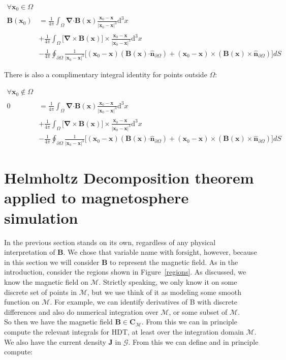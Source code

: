 \documentclass{article}
\newcommand\B{\mathbf{B}}
\newcommand\x{\mathbf{x}}
\newcommand\M{\mathcal{M}}
\newcommand\vsm[1]{\mathbf{C}_{#1}}
\newcommand\ifpi{\frac{1}{4\pi}}
\newcommand\dive[1]{\boldsymbol{\nabla} \boldsymbol{\cdot} #1}
\newcommand\curl[1]{\boldsymbol{\nabla} \times #1}
\newcommand\normal[1]{\mathbf{\hat{n}}_{#1}}
\newcommand\dV{\mathrm{d}^3x}
\newcommand\xoverx{\frac{\phantom{|} \x_0-\x \phantom{|^3}}{| \x_0-\x |^3}}
\newcommand\surf[2]{\frac{1}{|\x_0-\x|^3} \Big[(\x_0-\x) (#2 \boldsymbol{\cdot} #1) + (\x_0-\x)\times (#2 \times #1) \Big]}
\newcommand\coulombInt[1]{\ifpi \int_{#1} \dive{\B}(\x) \xoverx \dV}
\newcommand\biotsavInt[1]{\ifpi \int_{#1} \big[ \curl{\B}(\x) \big] \times \xoverx \dV}
\newcommand\surfInt[1]     {\ifpi \oint_{#1} \surf{\normal{#1}}{\B(\x)} dS}
\begin{document}
\begin{align}
\forall \mathbf{x}_0 \in \Omega \label{first_lemma} \\
\mathbf{B}(\mathbf{x}_0) &= \coulombInt{\Omega} \nonumber \\
                                                 &+ \biotsavInt{\Omega} \nonumber \\
                                                 &- \surfInt{\partial \Omega}  \nonumber
\end{align}

There is also a complimentary integral identity for points outside $\Omega$:

\begin{align}
\forall \mathbf{x}_0 \notin \Omega \label{second_lemma} \\
0 &= \coulombInt{\Omega} \nonumber \\
                                                 &+ \biotsavInt{\Omega} \nonumber \\
                                                 &- \surfInt{\partial \Omega}  \nonumber
\end{align}


\section{Helmholtz Decomposition theorem applied to magnetosphere simulation} \label{TheoremApplied}

In the previous section stands on its own, regardless of any physical interpretation of $\B$.
We chose that variable name with forsight, however, because in this section we will consider $\B$ to represent the magnetic field.
As in the introduction, consider the regions shown in Figure~\ref{regions}.
As discussed, we know the magnetic field on $\M$.
Strictly speaking, we only know it on some discrete set of points in $\M$,
but we use think of it as modeling some smooth function on $\M$.
For example, we can identify derivatives of B with discrete differences and also do numerical integration over $\M$, or some subset of $\M$. \\

So then we have the magnetic field $\B \in \vsm{\M}$.
From this we can in principle compute the relevant integrals for HDT, at least over the integration domain $\M$.
We also have the current density $\mathbf{J}$ in $\mathcal{G}$.
From this we can define and in principle compute:
\end{document}
